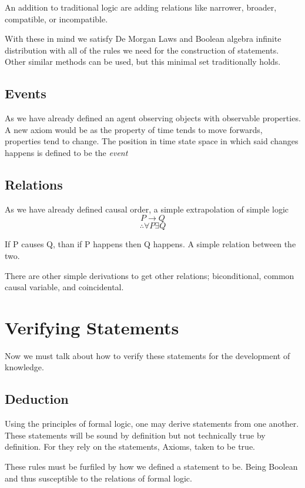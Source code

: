 An addition to traditional logic are adding relations like narrower, broader, compatible, or incompatible.

With these in mind we satisfy De Morgan Laws and Boolean algebra infinite distribution with all of the rules we need for the construction of statements.
Other similar methods can be used, but this minimal set traditionally holds.


\subsection{Events}

As we have already defined an agent observing objects with observable properties. A new axiom would be as the property of time tends to move forwards, properties tend to change. The position in time state space in which said changes happens is defined to be the \emph{event}

\subsection{Relations}

As we have already defined causal order, a simple extrapolation of simple logic
\[
  P \rightarrow Q
  \]
\[
\therefore \forall P \exists Q
  \]

  If P causes Q, than if P happens then Q happens. A simple relation between the two.

  There are other simple derivations to get other relations; biconditional, common causal variable, and coincidental.


\section{Verifying Statements}

Now we must talk about how to verify these statements for the development of knowledge.
\subsection{Deduction}

Using the principles of formal logic, one may derive statements from one another. These statements will be sound by definition but not
technically true by definition. For they rely on the statements, Axioms, taken to be true.

These rules must be furfiled by how we defined a statement to be. Being Boolean and thus susceptible to the relations of formal logic.

